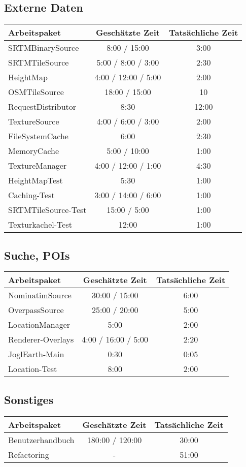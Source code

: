 \documentclass[10pt]{scrreprt}
\begin{document}
{\vspace*{5mm}
\subsection*{Externe Daten}
\vspace*{2mm}
\begin{tabular}{|l|c|c|}
\textbf{Arbeitspaket} & \textbf{Geschätzte Zeit} & \textbf{Tatsächliche Zeit}\\
\hline
SRTMBinarySource & 8:00 / 15:00 & 3:00\\
SRTMTileSource & 5:00 / 8:00 / 3:00 & 2:30\\
HeightMap & 4:00 / 12:00 / 5:00 & 2:00\\
OSMTileSource & 18:00 / 15:00 & 10\\
RequestDistributor & 8:30 & 12:00\\
TextureSource & 4:00 / 6:00 / 3:00 & 2:00\\
FileSystemCache & 6:00 & 2:30\\
MemoryCache & 5:00 / 10:00 & 1:00\\
TextureManager & 4:00 / 12:00 / 1:00 & 4:30\\
HeightMapTest & 5:30 & 1:00\\
Caching-Test & 3:00 / 14:00 / 6:00 & 1:00\\
SRTMTileSource-Test & 15:00 / 5:00 & 1:00\\
Texturkachel-Test & 12:00 & 1:00\\
\end{tabular}
\vspace*{5mm}
\subsection*{Suche, POIs}
\vspace*{2mm}
\begin{tabular}{|l|c|c|}
\textbf{Arbeitspaket} & \textbf{Geschätzte Zeit} & \textbf{Tatsächliche Zeit}\\
\hline
NominatimSource & 30:00 / 15:00 & 6:00\\
OverpassSource & 25:00 / 20:00 & 5:00\\
LocationManager & 5:00 & 2:00\\
Renderer-Overlays & 4:00 / 16:00 / 5:00 & 2:20\\
JoglEarth-Main & 0:30 & 0:05\\
Location-Test & 8:00 & 2:00\\
\end{tabular}

\vspace*{5mm}
\subsection*{Sonstiges}
\vspace*{2mm}
\begin{tabular}{|l|c|c|}
\textbf{Arbeitspaket} & \textbf{Geschätzte Zeit} & \textbf{Tatsächliche Zeit}\\
\hline
Benutzerhandbuch & 180:00 / 120:00 & 30:00\\
Refactoring & - & 51:00\\
\end{tabular}
}
\end{document}
